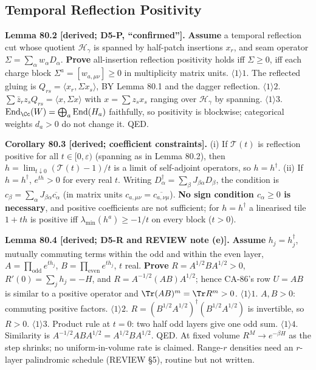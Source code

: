 \subsection{Temporal Reflection Positivity}

\textbf{Lemma 80.2 [derived; D5-P, ``confirmed''].}  \textbf{Assume} a temporal reflection cut whose
quotient \(\mathcal H_\gamma\) is spanned by half-patch insertions \(x_r\), and seam operator
\(\Sigma=\sum_\alpha w_\alpha D_\alpha\).  \textbf{Prove} all-insertion reflection positivity holds iff
\(\Sigma\ge0\), iff each charge block \(\Sigma^a=[w_{a,\mu\nu}]\ge0\) in multiplicity matrix units.
\(\langle1\rangle1\). The reflected gluing is \(Q_{rs}=\langle x_r,\Sigma x_s\rangle\), BY Lemma 80.1 and the
dagger reflection.  \(\langle1\rangle2\). \(\sum\bar z_rz_sQ_{rs}=\langle x,\Sigma x\rangle\) with \(x=\sum
z_sx_s\) ranging over \(\mathcal H_\gamma\) by spanning.  \(\langle1\rangle3\). \(\operatorname{End}_\Cc(W)
=\bigoplus_a\operatorname{End}(H_a)\) faithfully, so positivity is blockwise; categorical weights
\(d_a>0\) do not change it.  QED.

\textbf{Corollary 80.3 [derived; coefficient constraints].}  (i) If \(\mathcal T(t)\) is reflection
positive for all \(t\in[0,\varepsilon)\) (spanning as in Lemma 80.2), then \(h=\lim_{t\downarrow0}(\mathcal T(t)-1)/t\) is a limit of
self-adjoint operators, so \(h=h^\dagger\).  (ii) If \(h=h^\dagger\), \(e^{th}>0\) for every real \(t\).
Writing \(D_\alpha^\dagger=\sum_\beta J_{\beta\alpha}D_\beta\), the condition is
\(c_\beta=\sum_\alpha J_{\beta\alpha}\overline{c_\alpha}\) (in matrix units
\(c_{a,\mu\nu}=\overline{c_{a,\nu\mu}}\)).  \textbf{No sign condition \(c_\alpha\ge0\) is necessary}, and
positive coefficients are not sufficient; for \(h=h^\dagger\) a linearised tile \(1+th\) is positive iff
\(\lambda_{\min}(h^a)\ge-1/t\) on every block (\(t>0\)).

\textbf{Lemma 80.4 [derived; D5-R and REVIEW note (e)].}  \textbf{Assume} \(h_j=h_j^\dagger\), mutually
commuting terms within the odd and within the even layer, \(A=\prod_{\mathrm{odd}}e^{th_j}\),
\(B=\prod_{\mathrm{even}}e^{th_j}\), \(t\) real.  \textbf{Prove} \(R=A^{1/2}BA^{1/2}>0\), \(R'(0)=\sum_jh_j=-H\),
and \(R=A^{-1/2}(AB)A^{1/2}\); hence CA-86's row \(U=AB\) is similar to a positive operator and
\(\Tr(AB)^m=\Tr R^m>0\).
\(\langle1\rangle1\). \(A,B>0\): commuting positive factors.  \(\langle1\rangle2\).
\(R=(B^{1/2}A^{1/2})^\dagger(B^{1/2}A^{1/2})\) is invertible, so \(R>0\).  \(\langle1\rangle3\). Product rule
at \(t=0\): two half odd layers give one odd sum.  \(\langle1\rangle4\). Similarity is
\(A^{-1/2}ABA^{1/2}=A^{1/2}BA^{1/2}\).  QED.
At fixed volume \(R^M\to e^{-\beta H}\) as the step shrinks; no uniform-in-volume rate is claimed.
Range-\(r\) densities need an \(r\)-layer palindromic schedule (REVIEW \S5), routine but not written.

